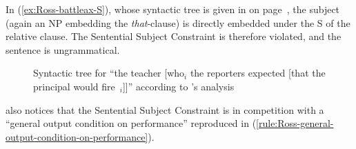 In (\ref{ex:Ross-battleax-S}), whose syntactic tree is given in  on page~\pageref{fig:Ross-battleax-tree-S}, the subject (again an NP embedding the \emph{that}-clause) is directly embedded under the S of the relative clause. The Sentential Subject Constraint is therefore violated, and the sentence is ungrammatical.

\begin{figure}[ht]
\caption{Syntactic tree for ``the teacher [who$_i$ the reporters expected [that the principal would fire~\trace{}$_i$]]'' according to \citeauthor{Ross.1967}'s analysis}
    \label{fig:Ross-battleax-tree-S}
\end{figure} 


\citeauthor{Ross.1967} also notices that the Sentential Subject Constraint is in competition with a ``general output condition on performance'' reproduced in (\ref{rule:Ross-general-output-condition-on-performance}).


